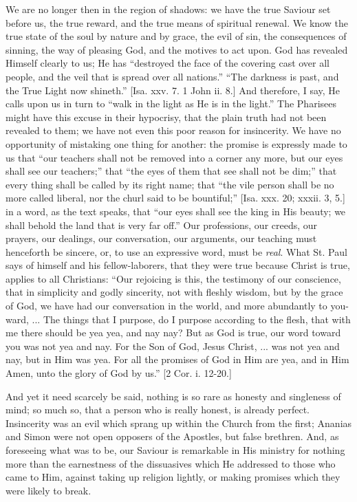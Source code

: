 We are no longer then in the region of shadows: we have the true
Saviour set before us, the true reward, and the true means of
spiritual renewal. We know the true state of the soul by nature and by
grace, the evil of sin, the consequences of sinning, the way of
pleasing God, and the motives to act upon. God has revealed Himself
clearly to us; He has ``destroyed the face of the covering cast
over all people, and the veil that is spread over all nations.''
``The darkness is past, and the True Light now shineth.'' [Isa.
xxv. 7. 1 John ii. 8.] And therefore, I say, He calls upon us in turn
to ``walk in the light as He is in the light.'' The Pharisees
might have this excuse in their hypocrisy, that the plain truth had
not been revealed to them; we have not even this poor reason for
insincerity. We have no opportunity of mistaking one thing for
another: the promise is expressly made to us that ``our teachers
shall not be removed into a corner any more, but our eyes shall see
our teachers;'' that ``the eyes of them that see shall not be
dim;'' that every thing shall be called by its right name; that
``the vile person shall be no more called liberal, nor the churl
said to be bountiful;'' [Isa. xxx. 20; xxxii. 3, 5.] in a word, as
the text speaks, that ``our eyes shall see the king in His beauty;
we shall behold the land that is very far off.'' Our professions,
our creeds, our prayers, our dealings, our conversation, our
arguments, our teaching must henceforth be sincere, or, to use an
expressive word, must be \emph{real}. What St. Paul says of himself
and his fellow-laborers, that they were true because Christ is true,
applies to all Christians: ``Our rejoicing is this, the testimony
of our conscience, that in simplicity and godly sincerity, not with
fleshly wisdom, but by the grace of God, we have had our conversation
in the world, and more abundantly to you-ward, ... The things that I
purpose, do I purpose according to the flesh, that with me there
should be yea yea, and nay nay? But as God is true, our word toward
you was not yea and nay. For the Son of God, Jesus Christ, ... was not
yea and nay, but in Him was yea. For all the promises of God in Him
are yea, and in Him Amen, unto the glory of God by us.'' [2 Cor. i.
12-20.]

And yet it need scarcely be said, nothing is so rare as honesty and
singleness of mind; so much so, that a person who is really honest, is
already perfect. Insincerity was an evil which sprang up within the
Church from the first; Ananias and Simon were not open opposers of the
Apostles, but false brethren. And, as foreseeing what was to be, our
Saviour is remarkable in His ministry for nothing more than the
earnestness of the dissuasives which He addressed to those who came to
Him, against taking up religion lightly, or making promises which they
were likely to break.


